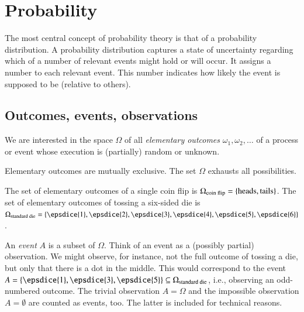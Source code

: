 \documentclass[nobib,nofonts]{tufte-handout}
\renewcommand{\markdef}[1]{\emph{#1}}
\begin{document}
\section{Probability}

The most central concept of probability theory is that of a probability distribution.
A probability distribution captures a state of uncertainty regarding which of a number of relevant events might hold or will occur.
It assigns a number to each relevant event.
This number indicates how likely the event is supposed to be (relative to others).

\subsection{Outcomes, events, observations}

We are interested in the space $\Omega$ of all \markdef{elementary outcomes} $\omega_1, \omega_2, \dots$ of a process or event whose execution is (partially) random or unknown.

Elementary outcomes are mutually exclusive.
The set $\Omega$ exhausts all possibilities.

\begin{example}
  The set of elementary outcomes of a single coin flip is $\Omega_{\text{coin flip}} =
  \left\{\text{heads}, \text{tails}\right\}$.
  The set of elementary outcomes of tossing a six-sided die is
  $\Omega_{\text{standard die}} = \set{\epsdice{1}, \epsdice{2}, \epsdice{3}, \epsdice{4},
    \epsdice{5}, \epsdice{6}}$.
\end{example}

An \markdef{event} $A$ is a subset of $\Omega$. Think of an event as a (possibly partial)
observation. We might observe, for instance, not the full outcome of tossing a die, but only
that there is a dot in the middle. This would correspond to the event
$A = \set{\epsdice{1}, \epsdice{3}, \epsdice{5}} \subseteq \Omega_{\text{standard die}}$,
i.e., observing an odd-numbered outcome. The trivial observation $A = \Omega$ and the
impossible observation $A = \emptyset$ are counted as events, too. The latter is included for
technical reasons.
\end{document}
